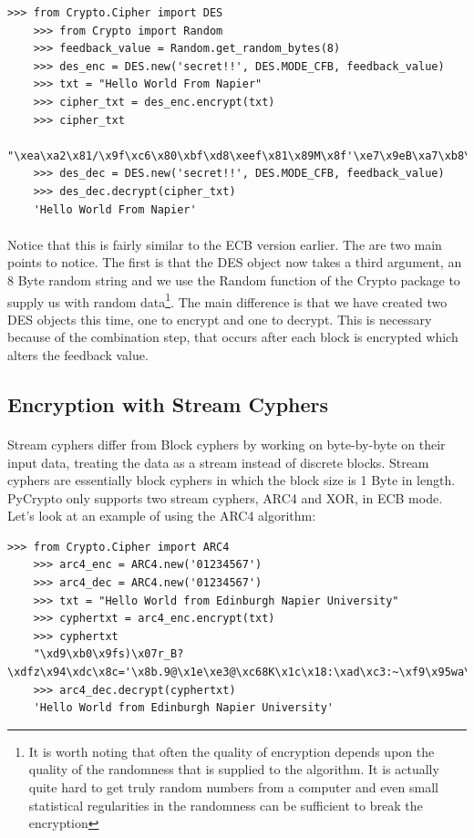 \documentclass[12pt, a4paper, twoside]{book}
\begin{document}
\begin{lstlisting}[style=DOS]
    >>> from Crypto.Cipher import DES
    >>> from Crypto import Random
    >>> feedback_value = Random.get_random_bytes(8)
    >>> des_enc = DES.new('secret!!', DES.MODE_CFB, feedback_value)
    >>> txt = "Hello World From Napier"
    >>> cipher_txt = des_enc.encrypt(txt)
    >>> cipher_txt
    "\xea\xa2\x81/\x9f\xc6\x80\xbf\xd8\xeef\x81\x89M\x8f'\xe7\x9eB\xa7\xb8\xd7\xd6"
    >>> des_dec = DES.new('secret!!', DES.MODE_CFB, feedback_value)
    >>> des_dec.decrypt(cipher_txt)
    'Hello World From Napier'
\end{lstlisting}


\paragraph{} Notice that this is fairly similar to the ECB version earlier. The are two main points to notice. The first is that the DES object now takes a third argument, an 8 Byte random string and we use the Random function of the Crypto package to supply us with random data\footnote{It is worth noting that often the quality of encryption depends upon the quality of the randomness that is supplied to the algorithm. It is actually quite hard to get truly random numbers from a computer and even small statistical regularities in the randomness can be sufficient to break the encryption}. The main difference is that we have created two DES objects this time, one to encrypt and one to decrypt. This is necessary because of the combination step, that occurs after each block is encrypted which alters the feedback value.

\subsection{Encryption with Stream Cyphers}
\paragraph{} Stream cyphers differ from Block cyphers by working on byte-by-byte on their input data, treating the data as a stream instead of discrete blocks. Stream cyphers are essentially block cyphers in which the block size is 1 Byte in length. PyCrypto only supports two stream cyphers, ARC4 and XOR, in ECB mode. Let's look at an example of using the ARC4 algorithm:

\begin{lstlisting}[style=DOS]
    >>> from Crypto.Cipher import ARC4
    >>> arc4_enc = ARC4.new('01234567')
    >>> arc4_dec = ARC4.new('01234567')
    >>> txt = "Hello World from Edinburgh Napier University"
    >>> cyphertxt = arc4_enc.encrypt(txt)
    >>> cyphertxt
    "\xd9\xb0\x9fs)\x07r_B?\xdfz\x94\xdc\x8c='\x8b.9@\x1e\xe3@\xc68K\x1c\x18:\xad\xc3:~\xf9\x95wa\xbcB\xa0U\x08\xe9"
    >>> arc4_dec.decrypt(cyphertxt)
    'Hello World from Edinburgh Napier University'
\end{lstlisting}
\end{document}
